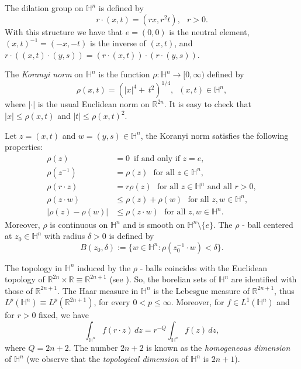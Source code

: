 \documentclass[reqno,10pt]{article}
\theoremstyle{definition}
\numberwithin{equation}{section}
\numberwithin{theorem}{section}
\begin{document}
The dilation group on $\mathbb{H}^n$ is defined by 
\[
r \cdot (x,t) = (rx, r^{2}t), \,\,\,\ r > 0.
\]
With this structure we have that $e = (0,0)$ is the neutral element, $(x, t)^{-1}=(-x, -t)$ is the inverse of $(x, t)$, and
$r \cdot((x,t) \cdot (y,s)) = (r\cdot(x,t)) \cdot (r\cdot(y,s))$. 

The \textit{Koranyi norm} on $\mathbb{H}^{n}$ is the function $\rho : \mathbb{H}^{n} \to [0, \infty)$ defined by
\begin{equation} \label{Koranyi norm}
\rho(x,t) = \left( |x|^{4} + \, t^{2}  \right)^{1/4}, \,\,\, (x,t) \in \mathbb{H}^{n},
\end{equation}
where $| \cdot |$ is the usual Euclidean norm on $\mathbb{R}^{2n}$. It is easy to check that $|x| \leq \rho(x,t)$ and $|t| \leq \rho(x,t)^2$.

Let $z = (x,t)$ and $w = (y,s) \in \mathbb{H}^{n}$, the Koranyi norm satisfies the following properties:
\begin{equation*}
\begin{split}
\rho(z) & = 0 \,\,\, \text{if and only if} \,\, z = e, \\
\rho(z^{-1}) & = \rho(z) \,\,\,\, \text{for all} \,\, z \in \mathbb{H}^{n}, \\
\rho(r \cdot z) & = r \rho(z) \,\,\,\, \text{for all} \,\, z \in \mathbb{H}^{n} \,\, \text{and all} \,\, r > 0, \\
\rho(z \cdot w) & \leq  \rho(z) + \rho(w) \,\,\,\, \text{for all} \,\, z, w \in \mathbb{H}^{n}, \\
| \rho(z) - \rho(w) | & \leq \rho(z \cdot w) \,\,\,\, \text{for all} \,\, z, w \in \mathbb{H}^{n}.
\end{split}
\end{equation*}
Moreover, $\rho$ is continuous on $\mathbb{H}^{n}$ and is smooth on $\mathbb{H}^{n} \setminus \{ e \}$. The $\rho$ - ball centered at 
$z_0 \in \mathbb{H}^{n}$ with radius $\delta > 0$ is defined by
\[
B(z_0, \delta) := \{ w \in \mathbb{H}^{n} : \rho(z_0^{-1} \cdot w) < \delta \}.
\]

The topology in $\mathbb{H}^{n}$ induced by the $\rho$ - balls coincides with the Euclidean topology of 
$\mathbb{R}^{2n} \times \mathbb{R} \equiv\mathbb{R}^{2n+1}$ (see \cite[Proposition 3.1.37]{Fischer}). So, the borelian sets of 
$\mathbb{H}^{n}$ are identified with those of $\mathbb{R}^{2n+1}$. The Haar measure in $\mathbb{H}^{n}$ is the Lebesgue measure of 
$\mathbb{R}^{2n+1}$, thus $L^{p}(\mathbb{H}^{n}) \equiv L^{p}(\mathbb{R}^{2n+1})$, for every $0 < p \leq \infty$. Moreover, for 
$f \in L^{1}(\mathbb{H}^{n})$ and for $r > 0$ fixed, we have
\begin{equation} \label{homog dim}
\int_{\mathbb{H}^{n}} f(r \cdot z) \, dz = r^{-Q} \int_{\mathbb{H}^{n}} f(z) \, dz,
\end{equation}
where $Q= 2n+2$. The number $2n+2$ is known as the \textit{homogeneous dimension} of $\mathbb{H}^{n}$ (we observe that the \textit{topological dimension} of $\mathbb{H}^{n}$ is $2n+1$).
\end{document}
